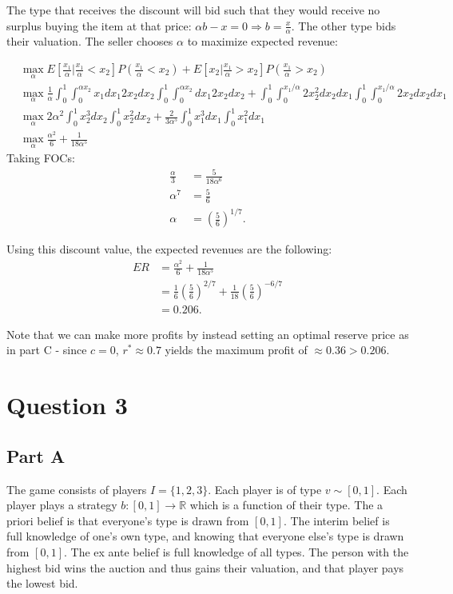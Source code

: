 \documentclass[11pt]{article} %
\begin{document}
The type that receives the discount will bid such that they would receive no surplus buying the item at that price: $\alpha b - x = 0\Rightarrow b = \frac{x}{\alpha}$. The other type bids their valuation. The seller chooses $\alpha$ to maximize expected revenue:

\begin{align*}
&\max_{\alpha} E\left[\frac{x_1}{\alpha}|\frac{x_1}{\alpha}<x_2\right] P\left(\frac{x_1}{\alpha}<x_2\right) + E\left[x_2|\frac{x_1}{\alpha}>x_2\right] P\left(\frac{x_1}{\alpha}>x_2\right)\\
&\max_{\alpha} \frac{1}{\alpha}\int_{0}^1\int_{0}^{\alpha x_2} x_1 dx_1 2x_2 dx_2 \int_{0}^1\int_{0}^{\alpha x_2} dx_1 2x_2 dx_2 + \int_{0}^1\int_{0}^{x_1/\alpha} 2x_2^2 dx_2 dx_1 \int_{0}^1\int_{0}^{x_1/\alpha}2x_2 dx_2  dx_1 \\
&\max_{\alpha} 2\alpha^2\int_{0}^1 x_2^3  dx_2 \int_{0}^1 x_2^2 dx_2 + \frac{2}{3\alpha^5}\int_{0}^1 x_1^3 dx_1 \int_{0}^1 x_1^2 dx_1 \\
&\max_{\alpha} \frac{\alpha^2}{6}+ \frac{1}{18\alpha^5} 
\end{align*}
Taking FOCs:
\begin{align*}
\frac{\alpha}{3} &= \frac{5}{18\alpha^6}\\
\alpha^7 &= \frac{5}{6}\\
\alpha &= \left( \frac{5}{6} \right)^{1/7}.
\end{align*}

Using this discount value, the expected revenues are the following:
\begin{align*}
ER &=  \frac{\alpha^2}{6}+ \frac{1}{18\alpha^5} \\
&= \frac{1}{6}\left( \frac{5}{6} \right)^{2/7} + \frac{1}{18}\left( \frac{5}{6} \right)^{-6/7}\\
&= 0.206.
\end{align*}

Note that we can make more profits by instead setting an optimal reserve price as in part C - since $c=0$, $r^{*} \approx 0.7$ yields the maximum profit of $\approx 0.36>0.206$.

\section{Question 3}
\subsection{Part A}
The game consists of players $I = \{ 1,2,3\}$. Each player is of type $v \sim  [0,1]$. Each player plays a strategy $b:[0,1]\rightarrow \mathbb{R}$ which is a function of their type. The a priori belief is that everyone's type is drawn from $[0,1]$. The interim belief is full knowledge of one's own type, and knowing that everyone else's type is drawn from $[0,1]$. The ex ante belief is full knowledge of all types. The person with the highest bid wins the auction and thus gains their valuation, and that player pays the lowest bid.
\end{document}
